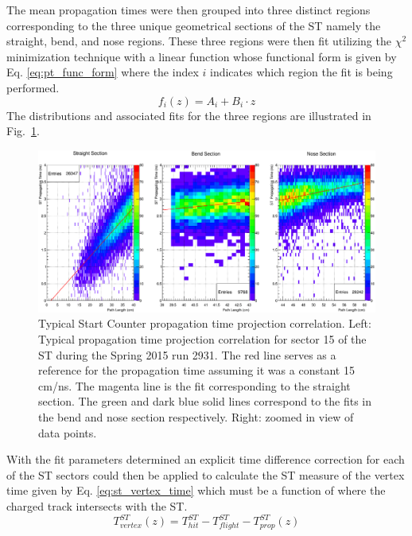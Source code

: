 The mean propagation times were then grouped into three distinct regions corresponding to the three unique geometrical sections of the ST namely the straight, bend, and nose regions.  These three regions were then fit utilizing the $\chi^{2}$ minimization technique with a linear function whose functional form is given by Eq. \ref{eq:pt_func_form} where the index $i$ indicates which region the fit is being performed.
	\begin{equation} \label{eq:pt_func_form}
		f_{i}(z) = A_{i} + B_{i} \cdot z
	\end{equation}
The distributions and associated fits for the three regions are illustrated in Fig.~\ref{fig:proptimeuncorrfits}.
	\begin{figure}[!htb]
		\centering
		\includegraphics[width=1.0\columnwidth]{calibration/figs/prop_time_uncorr_fits}
		\caption{Typical Start Counter propagation time projection correlation.  Left: Typical propagation time projection correlation for sector 15 of the ST during the Spring 2015 run 2931.  The red line serves as a reference for the propagation time assuming it was a constant 15 cm/ns.  The magenta line is the fit corresponding to the straight section.  The green and dark blue solid lines correspond to the fits in the bend and nose section respectively.  Right: zoomed in view of data points.}
		\label{fig:proptimeuncorrfits}
	\end{figure}
	
With the fit parameters determined an explicit time difference correction for each of the ST sectors could then be applied to calculate the ST measure of the vertex time given by Eq. \ref{eq:st_vertex_time} which must be a function of where the charged track intersects with the ST.
	\begin{equation}\label{eq:st_vertex_time}
	 	T^{ST}_{vertex}(z) = T^{ST}_{hit} - T^{ST}_{flight} - T^{ST}_{prop}(z)
	\end{equation} 
	
